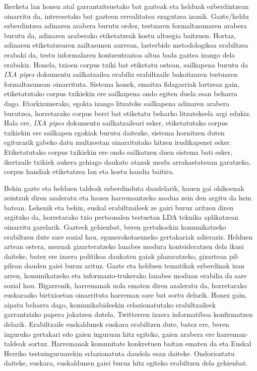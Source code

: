 \documentclass[information,article,submit,moreauthors,pdftex,10pt,a4paper]{Definitions/mdpi}
\begin{document}
Ikerketa lan honen atal garrantzitsuetako bat gazteak eta helduak ezberdintzean oinarritu da, interesetako bat gazteen errealitatea ezagutzea izanik. Gazte/heldu ezberdintzea adinaren arabera burutu ordez, testuaren formaltasunaren arabera burutu da, adinaren araberako etiketatzeak kostu altuegia baitzuen. Hortaz, adinaren etiketatzearen zailtasunen aurrean, lasterbide metodologikoa erabiltzea erabaki da, testu informalaren kontzentrazioa altua bada gaztea izango dela erabakiz. Honela, txioen corpus txiki bat etiketatu ostean, sailkapena burutu da \textit{IXA pipes} dokumentu sailkatzailea erabiliz erabiltzaile bakoitzaren testuaren formaltasunean oinarrituta. Sistema honek, emaitza fidagarriak lortzeaz gain, etiketatutako corpus txikiekin ere sailkapena ondo egiten duela esan beharra dago. Etorkizunerako, egokia izango litzateke sailkapena adinaren arabera burutzea, horretarako corpus berri bat etiketatu beharko litzatekeela argi edukiz. Hala ere, \textit{IXA pipes} dokumentu sailkatzaileari esker, etiketatutako corpus txikiekin ere sailkapen egokiak burutu daitezke, sistema hornitzen duten egiturarik gabeko datu multzoetan oinarritutako hitzen irudikapenei esker. Etiketatutako corpus txikiekin ere ondo sailkatzen duen sistema bati esker, ikertzaile txikiek aukera gehiago daukate atazak modu arrakastatsuan garatzeko, corpus handiak etiketatzea lan eta kostu handia baitira.

Behin gazte eta helduen taldeak ezberdinduta daudelarik, hauen gai ohikoenak zeintzuk diren azaleratu eta hauen harremantzeko modua zein den argitu da hein batean. Lehenik eta behin, euskal erabiltzaileek ze gairi buruz aritzen diren argituko da, horretarako txio pertsonalen testuetan LDA teknika aplikatzean oinarritu garelarik. Gazteek gehienbat, beren gertukoekin komunikatzeko erabiltzen dute sare sozial hau, egunerokotasuneko gertakariak adieraziz. Helduen artean ostera, mezuak gizarteratzeko lanabes modura kontsideratzen dela ikusi daiteke, batez ere izaera politikoa daukaten gaiak plazaratzeko, gizartean pil-pilean dauden gaiei buruz arituz. Gazte eta helduen tematikak ezberdinak izan arren, komunikatzeko eta informazio-trukerako lanabes moduan erabilia da sare sozial hau. Bigarrenik, harremanak nola ematen diren azaleratu da, horretarako euskarazko birtxioetan oinarrituta harreman sare bat sortu delarik. Honez gain, aipatu beharra dago, komunikabideekin erlazionatutako erabiltzaileek garrantzizko papera jokatzen dutela, Twitterren izaera informatiboa konfirmatzen delarik. Erabiltzaile euskaldunek euskara erabiltzen dute, batez ere, beren inguruko gertakari edo gaien inguruan hitz egiteko, gaien arabera ere harreman-taldeak sortuz. Harremanak komunitate konkretuen baitan ematen da eta Euskal Herriko testuinguruarekin erlazionatuta daudela esan daiteke. Ondorioztatu daiteke, euskara, euskaldunen gaiei buruz hitz egiteko erabiltzen dela gehienbat.
\end{document}

